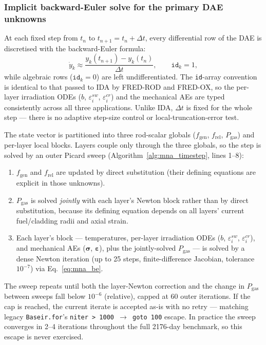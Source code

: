 \begin{refsection}
\subsubsection{Implicit backward-Euler solve for the primary DAE unknowns}
\label{sec:mna_backward_euler}

At each fixed step from $t_n$ to $t_{n+1} = t_n + \Delta t$, every differential row of the DAE is discretised with the backward-Euler formula:
\begin{equation}
  \dot{y}_k \approx \frac{y_k(t_{n+1}) - y_k(t_n)}{\Delta t},
  \qquad \mathtt{id}_k = 1,
  \label{eq:mna_be}
\end{equation}
while algebraic rows ($\mathtt{id}_k = 0$) are left undifferentiated.  The \texttt{id}-array convention is identical to that passed to IDA by FRED-ROD and FRED-OX, so the per-layer irradiation ODEs ($b$, $\varepsilon^{sw}_i$, $\varepsilon^{cr}_i$) and the mechanical AEs are typed consistently across all three applications.  Unlike IDA, $\Delta t$ is fixed for the whole step --- there is no adaptive step-size control or local-truncation-error test.

The state vector is partitioned into three rod-scalar globals ($f_\mathrm{gen}$, $f_\mathrm{rel}$, $P_\mathrm{gas}$) and per-layer local blocks.  Layers couple only through the three globals, so the step is solved by an outer Picard sweep (Algorithm~\ref{alg:mna_timestep}, lines 1--8):
\begin{enumerate}
\item $f_\mathrm{gen}$ and $f_\mathrm{rel}$ are updated by direct substitution (their defining equations are explicit in those unknowns).
\item $P_\mathrm{gas}$ is solved \emph{jointly} with each layer's Newton block rather than by direct substitution, because its defining equation depends on all layers' current fuel/cladding radii and axial strain.
\item Each layer's block --- temperatures, per-layer irradiation ODEs ($b$, $\varepsilon^{sw}_i$, $\varepsilon^{cr}_i$), and mechanical AEs ($\boldsymbol{\sigma}$, $\boldsymbol{\varepsilon}$), plus the jointly-solved $P_\mathrm{gas}$ --- is solved by a dense Newton iteration (up to 25 steps, finite-difference Jacobian, tolerance $10^{-7}$) via Eq.~\eqref{eq:mna_be}.
\end{enumerate}
The sweep repeats until both the layer-Newton correction and the change in $P_\mathrm{gas}$ between sweeps fall below $10^{-6}$ (relative), capped at 60 outer iterations.  If the cap is reached, the current iterate is accepted as-is with no retry --- matching legacy \texttt{Baseir.for}'s \texttt{niter\,>\,1000 $\to$ goto\,100} escape.  In practice the sweep converges in 2--4 iterations throughout the full 2176-day benchmark, so this escape is never exercised.


\end{refsection}
